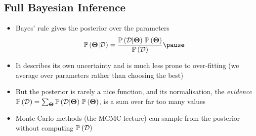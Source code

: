\begin{slide}
\section[-1]{Full Bayesian Inference}

\begin{PauseHighLight}
  \begin{itemize}
  \item Bayes' rule gives the posterior over the parameters
    \begin{align*}
      \Prob{\bm{\Theta}|\mathcal{D}} =
      \frac{\Prob{\mathcal{D}|\bm{\Theta}}\, \Prob{\bm{\Theta}}}{
      \Prob{\mathcal{D}} }\pause
    \end{align*}
  \item It describes its own uncertainty and is much less prone to
    over-fitting (we average over parameters rather than choosing the
    best)\pause
  \item But the posterior is rarely a nice function, and its
    normalisation, the \textit{evidence}
    $\mathbb{P}\left( \mathcal{D} \right) = \sum_{\bm{\Theta}}
    \mathbb{P}\left( \mathcal{D}|\bm{\Theta} \right)\, \mathbb{P}\left( \bm{\Theta} \right)$, is a sum over
    far too many values\pause
  \item Monte Carlo methods (the MCMC lecture) can sample from the
    posterior without computing $\mathbb{P}\left( \mathcal{D} \right)$\pause
  \end{itemize}
\end{PauseHighLight}

\end{slide}


